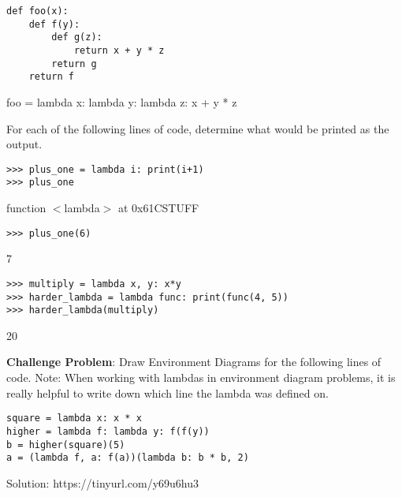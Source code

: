 \begin{lstlisting}
def foo(x):
    def f(y):
        def g(z):
            return x + y * z
        return g
    return f
\end{lstlisting}
\begin{solution}[0.25in]
foo = lambda x: lambda y: lambda z: x + y * z
\end{solution}
\newpage

\question 
For each of the following lines of code, determine what would be printed as the output. \newline
\begin{lstlisting}
>>> plus_one = lambda i: print(i+1)
>>> plus_one
\end{lstlisting}
\begin{solution}[0.25in]
function $<$lambda$>$ at 0x61CSTUFF
\end{solution}
\begin{lstlisting}
>>> plus_one(6)
\end{lstlisting}
\begin{solution}[0.25in]
7
\end{solution}
\begin{lstlisting}
>>> multiply = lambda x, y: x*y
>>> harder_lambda = lambda func: print(func(4, 5))
>>> harder_lambda(multiply)
\end{lstlisting}
\begin{solution}[0.25in]
20
\end{solution}


\question 
\textbf{Challenge Problem}: 
Draw Environment Diagrams for the following lines of code. 
\newline
Note: When working with lambdas in environment diagram problems, it is really helpful to write down  which line the lambda was defined on.
\begin{lstlisting}
square = lambda x: x * x
higher = lambda f: lambda y: f(f(y))
b = higher(square)(5)
a = (lambda f, a: f(a))(lambda b: b * b, 2)
\end{lstlisting}
\begin{solution}
Solution: https://tinyurl.com/y69u6hu3
\end{solution}
